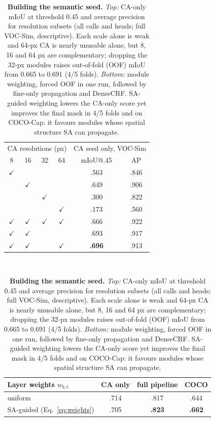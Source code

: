 \begin{table}[t]
\centering
\footnotesize\setlength{\tabcolsep}{3.2pt}
\begin{tabular}{@{}cccc|cc@{}}
\toprule
\multicolumn{4}{c|}{CA resolutions (px)} & \multicolumn{2}{c}{CA seed only, VOC-Sim}\\
8 & 16 & 32 & 64 & mIoU@.45 & AP \\
\midrule
$\checkmark$ & & & & .563 & .846 \\
 & $\checkmark$ & & & .649 & .906 \\
 & & $\checkmark$ & & .300 & .822 \\
 & & & $\checkmark$ & .173 & .560 \\
$\checkmark$ & $\checkmark$ & $\checkmark$ & $\checkmark$ & .666 & .922 \\
$\checkmark$ & $\checkmark$ & & & .693 & .917 \\
$\checkmark$ & $\checkmark$ & & $\checkmark$ & \textbf{.696} & .913 \\
\bottomrule
\end{tabular}\\[3pt]
\begin{tabular}{@{}lccc@{}}
\toprule
Layer weights $w_{b,t}$ & CA only & full pipeline & COCO \\
\midrule
uniform & .714 & .817 & .644 \\
SA-guided (Eq.~\ref{eq:weights}) & .705 & \textbf{.823} & \textbf{.662} \\
\bottomrule
\end{tabular}
\caption{\textbf{Building the semantic seed.} \emph{Top:} CA-only mIoU at threshold 0.45 and average precision for resolution subsets (all calls and heads; full VOC-Sim, descriptive). Each scale alone is weak and 64-px CA is nearly unusable alone, but 8, 16 and 64 px are complementary; dropping the 32-px modules raises out-of-fold (OOF) mIoU from 0.665 to 0.691 (4/5 folds). \emph{Bottom:} module weighting, forced OOF in one run, followed by fine-only propagation and DenseCRF. SA-guided weighting lowers the CA-only score yet improves the final mask in 4/5 folds and on COCO-Cap: it favours modules whose spatial structure SA can propagate.}
\label{tab:seed}
\end{table}
